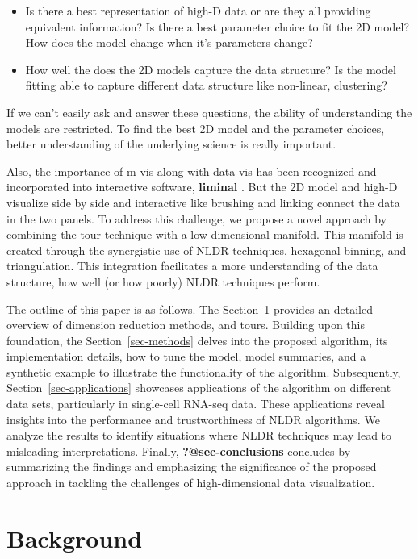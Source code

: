 \documentclass[
  12pt]{article}
\begin{document}
\begin{itemize}
\item
  Is there a best representation of high-D data or are they all
  providing equivalent information? Is there a best parameter choice to
  fit the 2D model? How does the model change when it's parameters
  change?
\item
  How well the does the 2D models capture the data structure? Is the
  model fitting able to capture different data structure like
  non-linear, clustering?
\end{itemize}

If we can't easily ask and answer these questions, the ability of
understanding the models are restricted. To find the best 2D model and
the parameter choices, better understanding of the underlying science is
really important.

Also, the importance of m-vis along with data-vis has been recognized
and incorporated into interactive software, \textbf{liminal}
\citep{article21}. But the 2D model and high-D visualize side by side
and interactive like brushing and linking connect the data in the two
panels. To address this challenge, we propose a novel approach by
combining the tour technique with a low-dimensional manifold. This
manifold is created through the synergistic use of NLDR techniques,
hexagonal binning, and triangulation. This integration facilitates a
more understanding of the data structure, how well (or how poorly) NLDR
techniques perform.

The outline of this paper is as follows. The
Section~\ref{sec-background} provides an detailed overview of dimension
reduction methods, and tours. Building upon this foundation, the
Section~\ref{sec-methods} delves into the proposed algorithm, its
implementation details, how to tune the model, model summaries, and a
synthetic example to illustrate the functionality of the algorithm.
Subsequently, Section~\ref{sec-applications} showcases applications of
the algorithm on different data sets, particularly in single-cell
RNA-seq data. These applications reveal insights into the performance
and trustworthiness of NLDR algorithms. We analyze the results to
identify situations where NLDR techniques may lead to misleading
interpretations. Finally, \textbf{?@sec-conclusions} concludes by
summarizing the findings and emphasizing the significance of the
proposed approach in tackling the challenges of high-dimensional data
visualization.

\hypertarget{sec-background}{%
\section{Background}\label{sec-background}}
\end{document}
